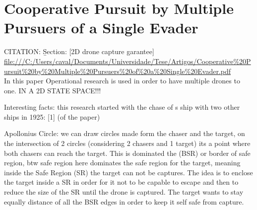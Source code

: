 \section{Cooperative Pursuit by Multiple Pursuers of a Single Evader}\label{Cooperative Pursuit by Multiple Pursuers of a Single Evader}

CITATION: \cite{Fang_2022} \b{Section: [2D drone capture garantee]}\\
\url{file:///C:/Users/caval/Documents/Universidade/Tese/Artigos/Cooperative%20Pursuit%20by%20Multiple%20Pursuers%20of%20a%20Single%20Evader.pdf}\\

In this paper Operational research is used in order to have multiple drones to one. IN A 2D STATE SPACE!!!

Interesting facts: this research started with the chase of s ship with two other ships in 1925: [1] (of the paper)

Apollonius Circle: we can draw circles made form the chaser and the target, on the intersection of 2 circles (considering 2 chasers and 1 target)
its a point where both chasers can reach the target. This is dominated the (BSR) or border of safe region, btw safe region here dominates the safe
region for the target, meaning inside the Safe Region (SR) the target can not be captures. The idea is to enclose the target inside 
a SR in order for it not to be capable to escape and then to reduce the size of the SR until the drone is captured. The target 
wants to stay equally distance of all the BSR edges in order to keep it self safe from capture.